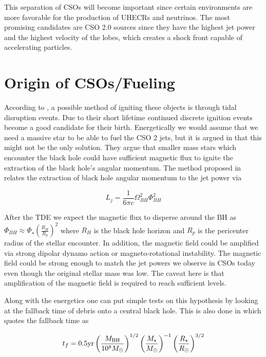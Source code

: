 This separation of CSOs will become important since certain environments are more favorable for the production of UHECRs and neutrinos. The most promising candidates are CSO 2.0 sources since they have the highest jet power and the highest velocity of the lobes, which creates a shock front capable of accelerating particles. 

\section{Origin of CSOs/Fueling}
According to \cite{readhead2023compact}, a possible method of igniting these objects is through tidal disruption events. Due to their short lifetime continued discrete ignition events become a good candidate for their birth. Energetically we would assume that we need a massive star to be able to fuel the CSO 2 jets, but it is argued in \cite{sullivan2024smallscale} that this might not be the only solution. They argue that smaller mass stars which encounter the black hole could have sufficient magnetic flux to ignite the extraction of the black hole's angular momentum. The method proposed in \cite{Blandford_1977} relates the extraction of black hole angular momentum to the jet power via 

\begin{equation}
    L_j = \frac{1}{6\pi c} \Omega_{BH}^2 \Phi_{BH}^2
\end{equation}

After the TDE we expect the magnetic flux to disperse around the BH as $\Phi_{BH} \approx \Phi_{\star} \left(\frac{R_{H}}{R_{p}}\right)^2$ where $R_{H}$ is the black hole horizon and $R_{p}$ is the pericenter radius of the stellar encounter. In addition, the magnetic field could be amplified via strong dipolar dynamo action or magneto-rotational instability. The magnetic field could be strong enough to match the jet powers we observe in CSOs today even though the original stellar mass was low. The caveat here is that amplification of the magnetic field is required to reach sufficient levels.


Along with the energetics one can put simple tests on this hypothesis by looking at the fallback time of debris onto a central black hole. This is also done in \cite{sullivan2024smallscale} which quotes the fallback time as 

\begin{equation}
    t_f = 0.5 \text{yr}\left(\frac{M_{\rm BH}}{10^8 M_{\odot}}\right)^{1/2}\left(\frac{M_\star}{M_{\odot}}\right)^{-1}\left(\frac{R_\star}{R_{\odot}}\right)^{3/2}
\end{equation}


